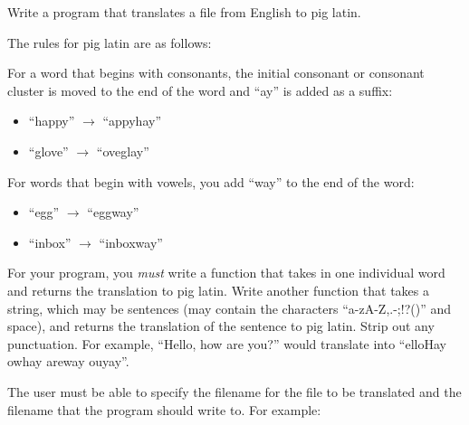 \documentclass[11pt]{cselabheader}
\begin{document}
\begin{ex}[piglatin.py] Write a program that translates a file from English to
  pig latin.

  The rules for pig latin are as follows:

  For a word that begins with consonants, the initial consonant or
  consonant cluster is moved to the end of the word and ``ay'' is added as a
  suffix:
  \begin{multicols}{2}
  \begin{itemize}
    \item ``happy'' $\to$ ``appyhay''
    \item ``glove'' $\to$ ``oveglay''
  \end{itemize}
  \end{multicols}

  For words that begin with vowels, you add ``way'' to the end of the word:
  \begin{multicols}{2}
  \begin{itemize}
    \item ``egg'' $\to$ ``eggway''
    \item ``inbox'' $\to$ ``inboxway''
  \end{itemize}
  \end{multicols}

  For your program, you \emph{must} write a function that takes in one
  individual word and returns the translation to pig latin. Write another
  function that takes a string, which may be sentences (may contain the
  characters ``a-zA-Z,.-;!?()'' and space), and returns the translation of the
  sentence to pig latin. Strip out any punctuation. For example, ``Hello, how
  are you?'' would translate into ``elloHay owhay areway ouyay''.

  The user must be able to specify the filename for the file to be translated
  and the filename that the program should write to. For example:

\end{ex}
\end{document}
